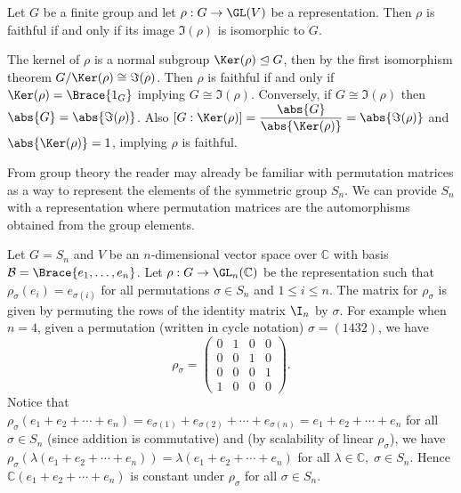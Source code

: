 \documentclass[../Project.tex]{subfiles}
\begin{document}
\begin{prop}[{\cite[Proposition 3.7]{2}}]
	Let $G$ be a finite group and let $\rho : G \to \GL(V)$ be a representation. Then $\rho$ is faithful if and only if its image $\Im(\rho)$ is isomorphic to $G$.
\end{prop}
\begin{proo*}[{\cite[Proposition 3.7]{2}}]
	The kernel of $\rho$ is a normal subgroup $\Ker(\rho) \trianglelefteq G$, then by the first isomorphism theorem $G/\Ker(\rho) \cong \Im(\rho)$. Then $\rho$ is faithful if and only if $\Ker(\rho) = \Brace{1_G}$ implying $G \cong \Im(\rho)$. Conversely, if $G \cong \Im(\rho)$ then $\abs{G} = \abs{\Im(\rho)}$. Also $[G : \Ker(\rho)] = \dfrac{\abs{G}}{\abs{\Ker(\rho)}} = \abs{\Im(\rho)}$ and $\abs{\Ker(\rho)} = 1$, implying $\rho$ is faithful.\\
\end{proo*}



From group theory the reader may already be familiar with permutation matrices as a way to represent the elements of the symmetric group $S_n$. We can provide $S_n$ with a representation where permutation matrices are the automorphisms obtained from the group elements.

\begin{exam}
	Let $G = S_n$ and $V$ be an $n$-dimensional vector space over $\mathbb{C}$ with basis $\mathcal{B} = \Brace{e_1,\dots,e_n}$. Let $\rho : G \to \GL_n(\mathbb{C})$ be the representation such that $\rho_\sigma(e_i) = e_{\sigma(i)}$ for all permutations $\sigma \in S_n$ and $1 \leqslant i \leqslant n$. The matrix for $\rho_\sigma$ is given by permuting the rows of the identity matrix $\I_n$ by $\sigma$. For example when $n = 4$, given a permutation (written in cycle notation) $\sigma = (1432)$, we have
	$$\rho_\sigma = \begin{pmatrix} 0 & 1 & 0 & 0 \\
									0 & 0 & 1 & 0\\
									0 & 0 & 0 & 1\\
									1 & 0 & 0 & 0\end{pmatrix}.$$
	Notice that $\rho_{\sigma}(e_1 + e_2 + \cdots + e_n) = e_{\sigma(1)} + e_{\sigma(2)} + \cdots + e_{\sigma(n)} = e_1 + e_2 + \cdots + e_n$ for all $\sigma \in S_n$ (since addition is commutative) and (by scalability of linear $\rho_\sigma$), we have $\rho_\sigma(\lambda(e_1 + e_2 + \cdots + e_n)) = \lambda(e_1 + e_2 + \cdots + e_n)$ for all $\lambda \in \mathbb{C},\;\sigma \in S_n$. Hence $\mathbb{C}(e_1 + e_2 + \cdots + e_n)$ is constant under $\rho_\sigma$ for all $\sigma \in S_n$.\\
\end{exam}
\end{document}
